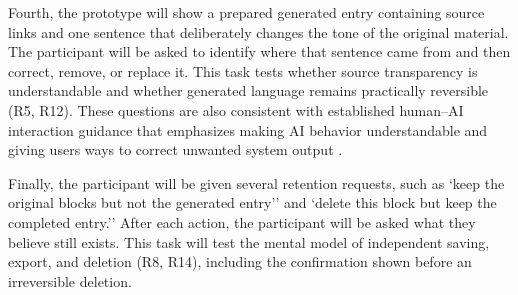 \documentclass[sigconf,nonacm]{acmart}
\begin{document}
Fourth, the prototype will show a prepared generated entry containing source
links and one sentence that deliberately changes the tone of the original
material. The participant will be asked to identify where that sentence came
from and then correct, remove, or replace it. This task tests whether source
transparency is understandable and whether generated language remains practically
reversible (R5, R12). These questions are also consistent with established
human--AI interaction guidance that emphasizes making AI behavior understandable
and giving users ways to correct unwanted system output
\cite{amershi2019guidelines}.

Finally, the participant will be given several retention requests, such as
`keep the original blocks but not the generated entry'' and `delete this block
but keep the completed entry.'' After each action, the participant will be asked
what they believe still exists. This task will test the mental model of
independent saving, export, and deletion (R8, R14), including the confirmation
shown before an irreversible deletion.
\end{document}
